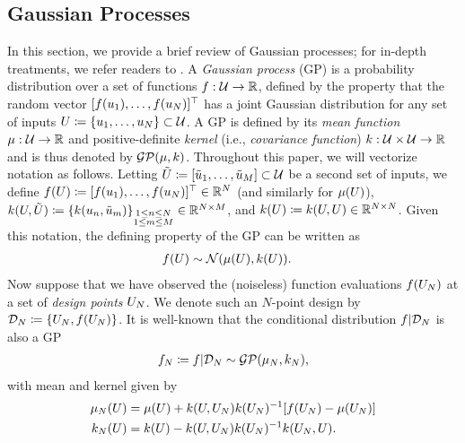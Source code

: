 \documentclass[12pt]{article}
\begin{document}
\subsection{Gaussian Processes}
In this section, we provide a brief review of Gaussian processes; for in-depth treatments, we refer readers to 
\cite{gramacy2020surrogates, StuartTeck2, gpML}. A \textit{Gaussian process} (GP) is a probability 
distribution over a set of functions $\func: \parSpace \to \R$, defined by the property that 
the random vector $[\func(\Par_1), \dots, \func(\Par_\Ndesign)]^\top$ has
a joint Gaussian distribution for any set of inputs $\parMat \Def \{\Par_1, \dots, \Par_\Ndesign\} \subset \parSpace$. 
A GP is defined by its \textit{mean function} $\gpMeanPrior: \parSpace \to \R$ and positive-definite \textit{kernel} 
(i.e., \textit{covariance function}) $\gpKerPrior: \parSpace \times \parSpace \to \R$ and is thus denoted by 
$\GP(\gpMeanPrior, \gpKerPrior)$. Throughout this paper, we will vectorize notation as follows. Letting 
$\tilde{\parMat} \Def [\tilde{\Par}_1, \dots, \tilde{\Par}_M]  \subset \parSpace$ be a second set of inputs, we define 
$\func(\parMat) \Def [\func(\Par_1), \dots, \func(\Par_\Ndesign)]^\top \in \R^{\Ndesign}$ (and similarly for $\gpMeanPrior(\parMat)$), 
$\gpKerPrior(\parMat, \tilde{\parMat}) \Def \{\gpKerPrior(\Par_{\idxDesign}, \tilde{\Par}_m)\}_{\substack{1 \leq \idxDesign \leq \Ndesign \\ 1 \leq m \leq M}} \in \R^{\Ndesign \times M}$, 
and $\gpKerPrior(\parMat) \Def \gpKerPrior(\parMat, \parMat) \in \R^{\Ndesign \times \Ndesign}$. Given this notation, 
the defining property of the GP can be written as 
\begin{align}
\func(\parMat) &\sim \Gaussian(\gpMeanPrior(\parMat), \gpKerPrior(\parMat)).
\end{align}
Now suppose that we have observed the (noiseless) function evaluations $\func(\designIn)$ at a set of \textit{design points} $\designIn$.
We denote such an $N$-point design by $\design[\Ndesign] \Def \{\designIn, \func(\designIn)\}$. 
It is well-known \cite{gpML} that the conditional distribution $\func|\design[\Ndesign]$ is also a GP
\begin{align}
\funcEm[\Ndesign] \Def \func|\design[\Ndesign] \sim \GP(\gpMean[\Ndesign], \gpKer[\Ndesign]), \label{generic_gp_conditional}
\end{align}
with mean and kernel given by 
\begin{align}
\gpMean[\Ndesign](\parMat) &= \gpMeanPrior(\parMat) + \gpKerPrior(\parMat, \designIn) \gpKerPrior(\designIn)^{-1} [\func(\designIn) - \gpMeanPrior(\designIn)] \label{kriging_eqns} \\
\gpKer[\Ndesign](\parMat) &= \gpKerPrior(\parMat) - \gpKerPrior(\parMat, \designIn) \gpKerPrior(\designIn)^{-1} \gpKerPrior(\designIn, \parMat). \nonumber
\end{align}
\end{document}
